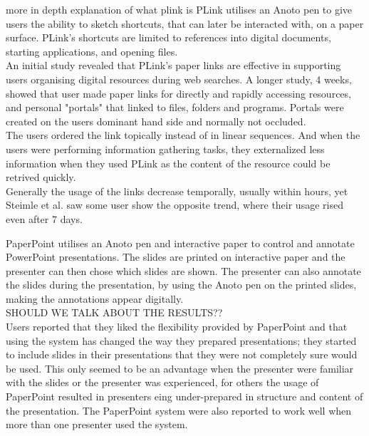 
more in depth explanation of what plink is
PLink \cite{steimle2011plink} utilises an Anoto pen to give users the ability to sketch shortcuts, that can later be interacted with,  on a paper surface. PLink’s shortcuts are limited to references into digital documents, starting applications, and opening files. \\
An initial study revealed that PLink's paper links are effective in supporting users organising digital resources during web searches.
A longer study, 4 weeks, showed that user made paper links for directly and rapidly accessing resources, and personal "portals" that linked to files, folders and programs. Portals were created on the users dominant hand side and normally not occluded. \\
The users ordered the link topically instead of in linear sequences. And when the users were performing information gathering tasks, they externalized less information when they used PLink as the content of the resource could be retrived quickly. \\
Generally the usage of the links decrease temporally, usually within hours, yet Steimle et al. saw some user show the opposite trend, where their usage rised even after 7 days. \par

PaperPoint \cite{Signer:2007:PPP:1226969.1226981} utilises an Anoto\cite{anoto2011anoto} pen and interactive paper to control and annotate PowerPoint  presentations. The slides are printed on interactive paper and the presenter can then chose which slides are shown. The presenter can also annotate the slides during the presentation, by using the Anoto pen on the printed slides, making the annotations appear digitally. \\
SHOULD WE TALK ABOUT THE RESULTS??\\
Users reported that they liked the flexibility provided by PaperPoint and that using the system has changed the way they prepared presentations; they started to include slides in their presentations that they were not completely sure would be used. This only seemed to be an advantage when the presenter were familiar with the slides or the presenter was experienced, for others the usage of PaperPoint resulted in presenters eing under-prepared in structure and content of the presentation. The PaperPoint system were also reported to work well when more than one presenter used the system.\\

